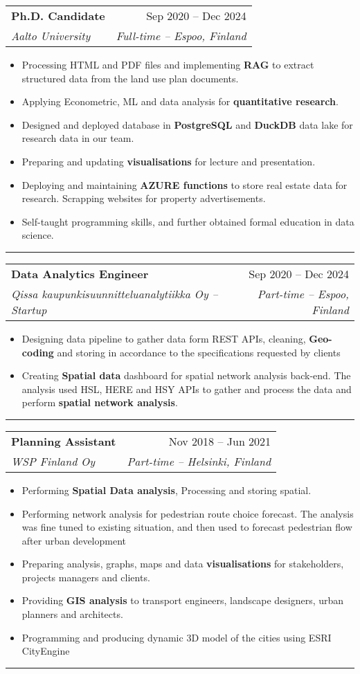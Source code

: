 \documentclass[a4paper,11pt]{article}
\makeatletter
\newcommand{\resumeItem}[1]{
	\item\small{#1}
}
\newcommand{\resumeItemListStart}{\begin{itemize}[rightmargin=0.11in]}
\newcommand{\resumeItemListEnd}{\end{itemize}}
\newcommand{\resumeQuadHeading}[4]{
	\item
	\begin{tabular*}{0.96\textwidth}[t]{l@{\extracolsep{\fill}}r}
		\textbf{#1} & #2 \\
		\textit{\small#3} & \textit{\small #4} \\
	\end{tabular*}
}
\makeatother
\begin{document}
	\resumeQuadHeading{Ph.D. Candidate}{Sep 2020 -- Dec 2024}
	{Aalto University}  {Full-time -- Espoo, Finland}
	\resumeItemListStart{}
	\resumeItem{Processing HTML and PDF files and implementing \textbf{RAG} to extract structured data from the land use plan documents.}
	\resumeItem{Applying Econometric, ML and data analysis for \textbf{quantitative research}.}
	\resumeItem{Designed and deployed database in \textbf{PostgreSQL} and \textbf{DuckDB} data lake for research data in our team.}
	\resumeItem{Preparing and updating \textbf{visualisations} for lecture and presentation.}
	\resumeItem{Deploying and maintaining \textbf{AZURE functions} to store real estate data for research. Scrapping websites for property advertisements.}
	\resumeItem{Self-taught programming skills, and further obtained formal education in data science.}
	\resumeItemListEnd{}
	\noindent\rule{0.5\linewidth}{0.4pt}

	\resumeQuadHeading{Data Analytics Engineer}{Sep 2020 -- Dec 2024}
	{Qissa kaupunkisuunnitteluanalytiikka Oy -- Startup}  {Part-time -- Espoo, Finland}
	\resumeItemListStart{}
	\resumeItem{Designing data pipeline to gather data form REST APIs, cleaning, \textbf{Geo-coding} and storing in accordance to the specifications requested by clients}
	\resumeItem{Creating \textbf{Spatial data} dashboard for spatial network analysis back-end. The analysis used HSL, HERE and HSY APIs to gather and process the data and perform \textbf{spatial network analysis}.}
	\resumeItemListEnd{}
	\noindent\rule{0.5\linewidth}{0.4pt}
	
	\resumeQuadHeading{Planning Assistant}  {Nov 2018 -- Jun 2021}
	{WSP Finland Oy}  {Part-time -- Helsinki, Finland}
	\resumeItemListStart{}
	\resumeItem{Performing \textbf{Spatial Data analysis}, Processing and storing spatial.}
	\resumeItem{Performing network analysis for pedestrian route choice forecast. The analysis was fine tuned to existing situation, and then used to forecast pedestrian flow after urban development}
	\resumeItem{Preparing analysis, graphs, maps and data \textbf{visualisations} for stakeholders, projects managers and clients.}
	\resumeItem{Providing \textbf{GIS analysis} to transport engineers, landscape designers, urban planners and architects.}
	\resumeItem{Programming and producing dynamic 3D model of the cities using ESRI CityEngine}
	\resumeItemListEnd{}
	\noindent\rule{0.5\linewidth}{0.4pt}
\end{document}
